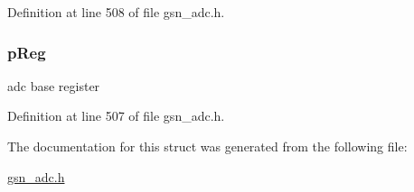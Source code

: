 Definition at line 508 of file gsn\_\-adc.h.

\hypertarget{a00022_a733fb7afbc3bd37a546de0e37c12f150}{
\subsubsection[{pReg}]{ {\bf pReg}}}
\label{a00022_a733fb7afbc3bd37a546de0e37c12f150}
adc base register 

Definition at line 507 of file gsn\_\-adc.h.



The documentation for this struct was generated from the following file:\begin{DoxyCompactItemize}
\item 
\hyperlink{a00474}{gsn\_\-adc.h}\end{DoxyCompactItemize}

